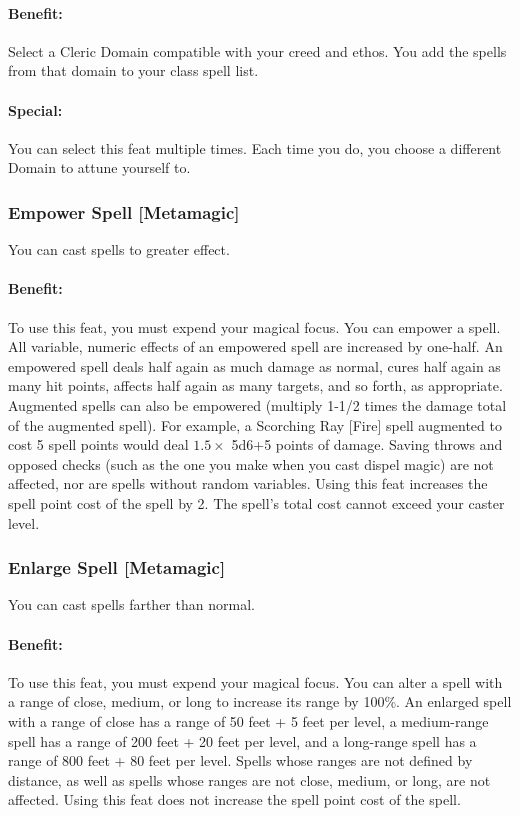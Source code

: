 \paragraph{Benefit:} Select a Cleric Domain compatible with your creed and ethos. You add the spells from that domain to your class spell list.

\paragraph{Special:} You can select this feat multiple times. Each time you do, you choose a different Domain to attune yourself to.
\subsubsection[Empower Spell]{Empower Spell [Metamagic]}
\label{Feat:EmpowerSpell}
You can cast spells to greater effect.

\paragraph{Benefit:} To use this feat, you must expend your magical focus.
You can empower a spell. All variable, numeric effects of an empowered spell are increased by one-half. 
An empowered spell deals half again as much damage as normal, 
cures half again as many hit points, affects half again as many targets, and so forth, as appropriate. 
Augmented spells can also be empowered (multiply 1-1/2 times the damage total of the augmented spell). 
For example, a Scorching Ray [Fire] spell augmented to cost 5 spell points would deal
$1.5 \times$ 5d6+5 points of damage.
Saving throws and opposed checks (such as the one you make when you cast dispel magic) are not affected, 
nor are spells without random variables.
Using this feat increases the spell point cost of the spell by 2. The spell's total cost cannot exceed your caster level.

\subsubsection[Enlarge Spell]{Enlarge Spell [Metamagic]}
\label{Feat:EnlargeSpell}
You can cast spells farther than normal.

\paragraph{Benefit:} To use this feat, you must expend your magical focus. 
You can alter a spell with a range of close, medium, or long to increase its range by 100\%. 
An enlarged spell with a range of close has a range of 50 feet + 5 feet per level, 
a medium-range spell has a range of 200 feet + 20 feet per level, 
and a long-range spell has a range of 800 feet + 80 feet per level.
Spells whose ranges are not defined by distance, as well as spells whose ranges are not close, medium, or long, are not affected.
Using this feat does not increase the spell point cost of the spell.

